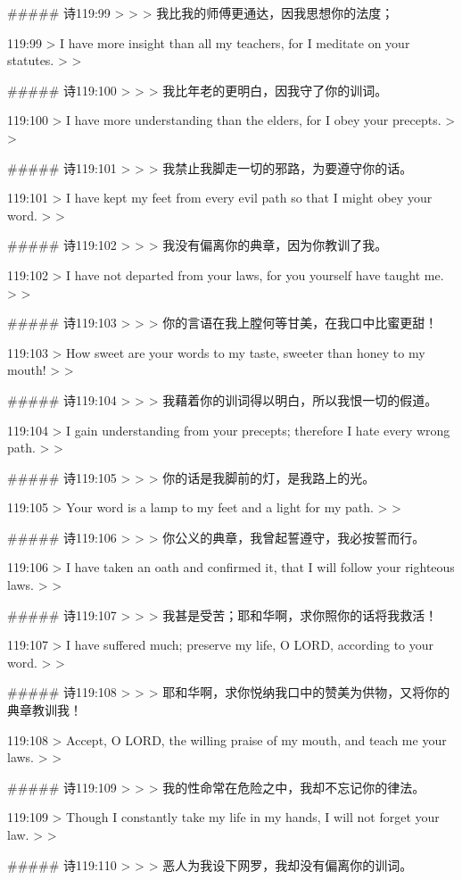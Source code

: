 ##### 诗119:99
> 
>
> 我比我的师傅更通达，因我思想你的法度；


119:99
> I have more insight than all my teachers, for I meditate on your statutes.
>
> 


##### 诗119:100
> 
>
> 我比年老的更明白，因我守了你的训词。


119:100
> I have more understanding than the elders, for I obey your precepts.
>
> 


##### 诗119:101
> 
>
> 我禁止我脚走一切的邪路，为要遵守你的话。


119:101
> I have kept my feet from every evil path so that I might obey your word.
>
> 


##### 诗119:102
> 
>
> 我没有偏离你的典章，因为你教训了我。


119:102
> I have not departed from your laws, for you yourself have taught me.
>
> 


##### 诗119:103
> 
>
> 你的言语在我上膛何等甘美，在我口中比蜜更甜！


119:103
> How sweet are your words to my taste, sweeter than honey to my mouth!
>
> 


##### 诗119:104
> 
>
> 我藉着你的训词得以明白，所以我恨一切的假道。


119:104
> I gain understanding from your precepts; therefore I hate every wrong path.
>
> 


##### 诗119:105
> 
>
> 你的话是我脚前的灯，是我路上的光。


119:105
> Your word is a lamp to my feet and a light for my path.
>
> 


##### 诗119:106
> 
>
> 你公义的典章，我曾起誓遵守，我必按誓而行。


119:106
> I have taken an oath and confirmed it, that I will follow your righteous laws.
>
> 


##### 诗119:107
> 
>
> 我甚是受苦；耶和华啊，求你照你的话将我救活！


119:107
> I have suffered much; preserve my life, O LORD, according to your word.
>
> 


##### 诗119:108
> 
>
> 耶和华啊，求你悦纳我口中的赞美为供物，又将你的典章教训我！


119:108
> Accept, O LORD, the willing praise of my mouth, and teach me your laws.
>
> 


##### 诗119:109
> 
>
> 我的性命常在危险之中，我却不忘记你的律法。


119:109
> Though I constantly take my life in my hands, I will not forget your law.
>
> 


##### 诗119:110
> 
>
> 恶人为我设下网罗，我却没有偏离你的训词。


